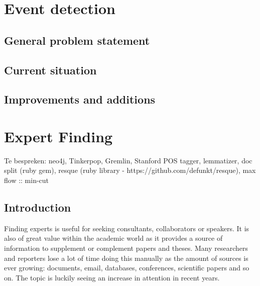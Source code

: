\section{Event detection}

\subsection{General problem statement}


\subsection{Current situation}

\subsection{Improvements and additions}


\section{Expert Finding}

Te bespreken: neo4j, Tinkerpop, Gremlin, Stanford POS tagger, lemmatizer, doc split (ruby gem), resque (ruby library - https://github.com/defunkt/resque), max flow :: min-cut

\subsection{Introduction}

Finding experts is useful for seeking consultants, collaborators or speakers. It is also of great value within the academic world as it provides a source of information to supplement or complement papers and theses. Many researchers and reporters lose a lot of time doing this manually as the amount of sources is ever growing: documents, email, databases, conferences, scientific papers and so on. The topic is luckily seeing an increase in attention in recent years.


